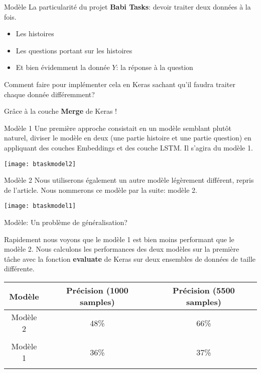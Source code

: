 \documentclass{beamer}
\theoremstyle{definition}
\begin{document}
\begin{frame}{Modèle}
La particularité du projet \textbf{Babi Tasks}: devoir traiter deux données à la fois.

\begin{itemize}
\item Les histoires
\item Les questions portant sur les histoires
\item Et bien évidemment la donnée $Y$: la réponse à la question
\end{itemize}

Comment faire pour implémenter cela en Keras sachant qu'il faudra traiter chaque donnée différemment?
\pause

\vspace{0.5cm}

Grâce à la couche \textbf{Merge} de Keras !
\end{frame}

\begin{frame}{Modèle 1}
Une première approche consistait en un modèle semblant plutôt naturel, diviser le modèle en deux (une partie histoire et une partie question) en appliquant des couches Embeddings et des couche LSTM. Il s'agira du modèle 1.

\begin{center}
\texttt{[image: btaskmodel2]}
\end{center}

\end{frame}

\begin{frame}{Modèle 2}
Nous utiliserons également un autre modèle légèrement différent, repris de l'article\cite{1}. Nous nommerons ce modèle par la suite: modèle 2.

\begin{center}
\texttt{[image: btaskmodel1]}
\end{center}

\end{frame}

\begin{frame}{Modèle: Un problème de généralisation?}

Rapidement nous voyons que le modèle 1 est bien moins performant que le modèle 2. Nous calculons les performances des deux modèles sur la première tâche avec la fonction \textbf{evaluate} de Keras sur deux ensembles de données de taille différente.

\vspace{1.5cm}

				\begin{tabular}{ccc}
					
					\toprule
					Modèle & Précision (1000 samples) & Précision (5500 samples) \\ 
					\midrule
					Modèle 2 & 48\% & 66\%  \\ 
					\\
					Modèle 1 & 36\% & 37\% \\ 
					\\
					\bottomrule
                \end{tabular}
\end{frame}
\end{document}
